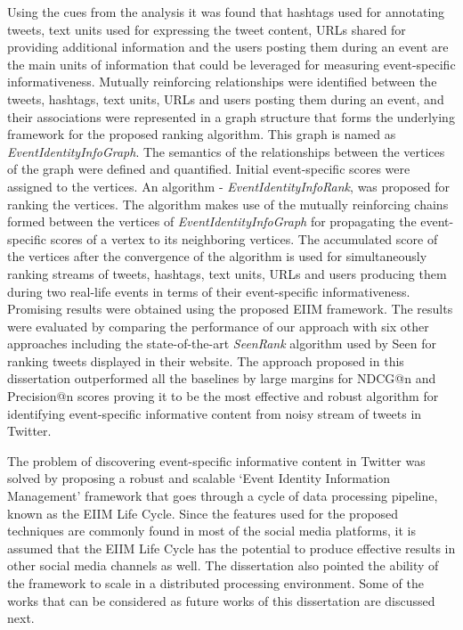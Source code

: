 Using the cues from the analysis it was found that hashtags used for annotating tweets, text units used for expressing the tweet content, URLs shared for providing additional information and the users posting them during an event are the main units of information that could be leveraged for measuring event-specific informativeness.  Mutually reinforcing relationships were identified between the tweets, hashtags, text units, URLs and users posting them during an event, and their associations were represented in a graph structure that forms the underlying framework for the proposed ranking algorithm. This graph is named as \textit{EventIdentityInfoGraph}. The semantics of the relationships between the vertices of the graph were defined and quantified. Initial event-specific scores were assigned to the vertices. An algorithm - \textit{EventIdentityInfoRank}, was proposed for ranking the vertices. The algorithm makes use of the mutually reinforcing chains formed between the vertices of \textit{EventIdentityInfoGraph} for propagating the event-specific scores of a vertex to its neighboring vertices. The accumulated score of the vertices after the convergence of the algorithm is used for simultaneously ranking streams of tweets, hashtags, text units, URLs and users producing them during two real-life events in terms of their event-specific informativeness. Promising results were obtained using the proposed EIIM framework. The results were evaluated by comparing the performance of our approach with six other approaches including the state-of-the-art \textit{SeenRank} algorithm used by Seen for ranking tweets displayed in their website. The approach proposed in this dissertation outperformed all the baselines by large margins for NDCG@n and Precision@n scores proving it to be the most effective and robust algorithm for identifying event-specific informative content from noisy stream of tweets in Twitter.

The problem of discovering event-specific informative content in Twitter was solved by proposing a robust and scalable `Event Identity Information Management' framework that goes through a cycle of data processing pipeline, known as the EIIM Life Cycle.  Since the features used for the proposed techniques are commonly found in most of the social media platforms, it is assumed that the EIIM Life Cycle has the potential to produce effective results in other social media channels as well. The dissertation also pointed the ability of the framework to scale in a distributed processing environment. Some of the works that can be considered as future works of this dissertation are discussed next. 


